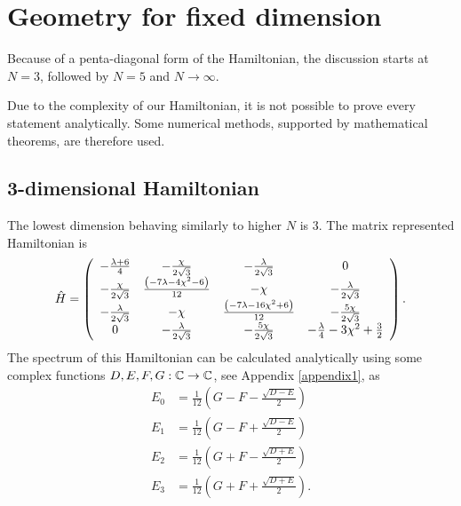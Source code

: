 \section{Geometry for fixed dimension}
Because of a penta-diagonal form of the Hamiltonian, the discussion starts at $N=3$, followed by $N=5$ and $N\rightarrow\infty$.

Due to the complexity of our Hamiltonian, it is not possible to prove every statement analytically. Some numerical methods, supported by mathematical theorems, are therefore used.



\subsection{3-dimensional Hamiltonian}
The lowest dimension behaving similarly to higher $N$ is 3. The matrix represented Hamiltonian is
\begin{equation}
    \hat{H}=\left(
        \begin{array}{cccc}
         -\frac{ \lambda +6}{4} & -\frac{\chi }{2 \sqrt{3}} & -\frac{\lambda }{2 \sqrt{3}} & 0 \\
         -\frac{\chi }{2 \sqrt{3}} & \frac{ \left(-7 \lambda -4 \chi ^2-6\right)}{12} & -\chi  & -\frac{\lambda }{2 \sqrt{3}} \\
         -\frac{\lambda }{2 \sqrt{3}} & -\chi  & \frac{ \left(-7 \lambda -16 \chi ^2+6\right)}{12} & -\frac{5 \chi }{2 \sqrt{3}} \\
         0 & -\frac{\lambda }{2 \sqrt{3}} & -\frac{5 \chi }{2 \sqrt{3}} & -\frac{\lambda }{4}-3 \chi ^2+\frac{3}{2} \\
        \end{array}
        \right).
\end{equation}
The spectrum of this Hamiltonian can be calculated analytically using some complex functions $D, E, F, G:\mathbb{C}\rightarrow \mathbb{C}$, see Appendix \ref{appendix1}, as
\begin{align}
        E_0 &= \frac{1}{12} \left(G-F-\frac{\sqrt{D-E}}{2}\right)
        \label{eq:N=3_en0}\\
        E_1 &= \frac{1}{12}  \left(G-F+\frac{\sqrt{D-E}}{2}\right)
        \label{eq:N=3_en1}\\
        E_2 &= \frac{1}{12} \left(G+F-\frac{\sqrt{D+E}}{2}\right)
        \label{eq:N=3_en2}\\
        E_3 &= \frac{1}{12}  \left(G+F+\frac{\sqrt{D+E}}{2}\right).
        \label{eq:N=3_en3}
\end{align}
